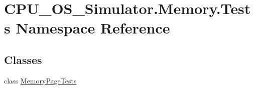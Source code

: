 \hypertarget{namespace_c_p_u___o_s___simulator_1_1_memory_1_1_tests}{}\section{C\+P\+U\+\_\+\+O\+S\+\_\+\+Simulator.\+Memory.\+Tests Namespace Reference}
\label{namespace_c_p_u___o_s___simulator_1_1_memory_1_1_tests}
\subsection*{Classes}
\begin{DoxyCompactItemize}
\item 
class \hyperlink{class_c_p_u___o_s___simulator_1_1_memory_1_1_tests_1_1_memory_page_tests}{Memory\+Page\+Tests}
\end{DoxyCompactItemize}
